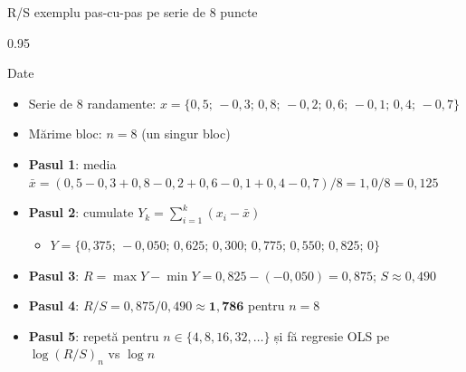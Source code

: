 \documentclass[9pt, aspectratio=169, t]{beamer}
\begin{document}
\begin{frame}[shrink=15]{R/S exemplu pas-cu-pas pe serie de 8 puncte}
\begin{cminipage}{0.95\textwidth}
\begin{exampleblock}{Date}
\begin{itemize}\setlength{\itemsep}{0pt}
    \item Serie de 8 randamente: $x=\{0{,}5;\,-0{,}3;\,0{,}8;\,-0{,}2;\,0{,}6;\,-0{,}1;\,0{,}4;\,-0{,}7\}$
    \item Mărime bloc: $n=8$ (un singur bloc)
\end{itemize}
\end{exampleblock}
\begin{itemize}\setlength{\itemsep}{0pt}
    \item \textbf{Pasul 1}: media $\bar x=(0{,}5-0{,}3+0{,}8-0{,}2+0{,}6-0{,}1+0{,}4-0{,}7)/8=1{,}0/8=0{,}125$
    \item \textbf{Pasul 2}: cumulate $Y_k=\sum_{i=1}^k(x_i-\bar x)$
    \begin{itemize}\setlength{\itemsep}{0pt}
        \item $Y=\{0{,}375;\,-0{,}050;\,0{,}625;\,0{,}300;\,0{,}775;\,0{,}550;\,0{,}825;\,0\}$
    \end{itemize}
    \item \textbf{Pasul 3}: $R=\max Y-\min Y=0{,}825-(-0{,}050)=0{,}875$; $S\approx 0{,}490$
    \item \textbf{Pasul 4}: $R/S=0{,}875/0{,}490\approx \mathbf{1{,}786}$ pentru $n=8$
    \item \textbf{Pasul 5}: repetă pentru $n\in\{4,8,16,32,\ldots\}$ și fă regresie OLS pe $\log(R/S)_n$ vs $\log n$
\end{itemize}
\end{cminipage}
\end{frame}
\end{document}

